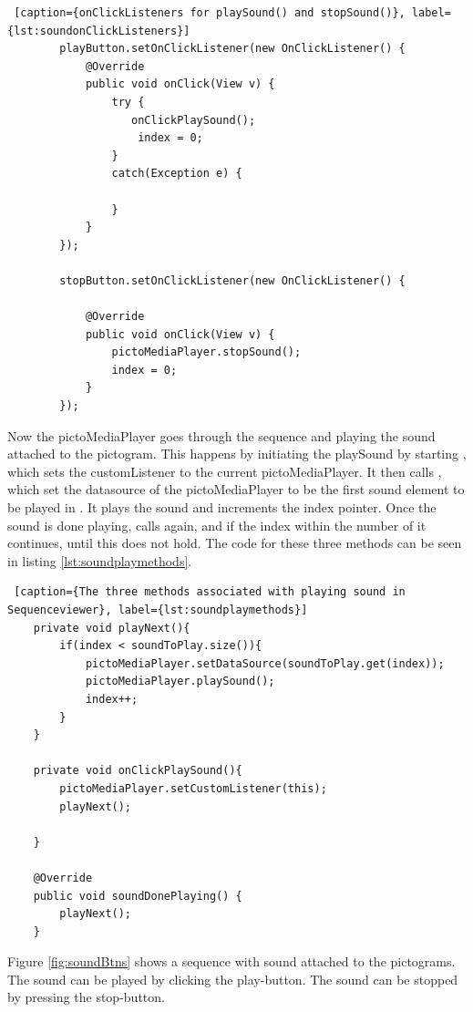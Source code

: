 \begin{lstlisting} [caption={onClickListeners for playSound() and stopSound()}, label={lst:soundonClickListeners}]
        playButton.setOnClickListener(new OnClickListener() {
            @Override
            public void onClick(View v) {
                try {
                   onClickPlaySound();
                    index = 0;
                }
                catch(Exception e) {

                }
            }
        });

        stopButton.setOnClickListener(new OnClickListener() {

            @Override
            public void onClick(View v) {
                pictoMediaPlayer.stopSound();
                index = 0;
            }
        });
\end{lstlisting}

Now the pictoMediaPlayer goes through the sequence and playing the sound attached to the pictogram. This happens by initiating the playSound by starting , which sets the customListener to the current pictoMediaPlayer. It then calls , which set the datasource of the pictoMediaPlayer to be the first sound element to be played in . It plays the sound and increments the index pointer. Once the sound is done playing,  calls  again, and if the index within the number of  it continues, until this does not hold. The code for these three methods can be seen in listing \ref{lst:soundplaymethods}.

\begin{lstlisting} [caption={The three methods associated with playing sound in Sequenceviewer}, label={lst:soundplaymethods}]
    private void playNext(){
        if(index < soundToPlay.size()){
            pictoMediaPlayer.setDataSource(soundToPlay.get(index));
            pictoMediaPlayer.playSound();
            index++;
        }
    }

    private void onClickPlaySound(){
        pictoMediaPlayer.setCustomListener(this);
        playNext();

    }

    @Override
    public void soundDonePlaying() {
        playNext();
    }
\end{lstlisting}

Figure \ref{fig:soundBtns} shows a sequence with sound attached to the pictograms. The sound can be played by clicking the play-button. The sound can be stopped by pressing the stop-button.

